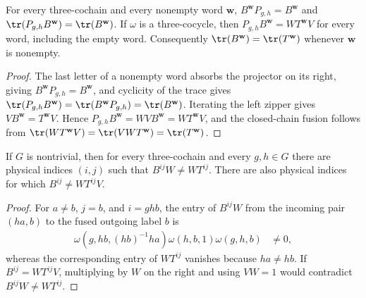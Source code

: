\begin{lemma}
    \label{thm:asymex_pbc_projector_closure}
    \leanok
    For every three-cochain and every nonempty word $\mathbf w$,
    $B^{\mathbf w}P_{g,h}=B^{\mathbf w}$ and
    $\tr(P_{g,h}B^{\mathbf w})=\tr(B^{\mathbf w})$.
    If $\omega$ is a three-cocycle, then
    $P_{g,h}B^{\mathbf w}=WT^{\mathbf w}V$ for every word, including the
    empty word. Consequently $\tr(B^{\mathbf w})=\tr(T^{\mathbf w})$
    whenever $\mathbf w$ is nonempty.
\end{lemma}

\begin{proof}
    \leanok
    The last letter of a nonempty word absorbs the projector on its right,
    giving $B^{\mathbf w}P_{g,h}=B^{\mathbf w}$, and cyclicity of the trace
    gives $\tr(P_{g,h}B^{\mathbf w})=\tr(B^{\mathbf w}P_{g,h})=\tr(B^{\mathbf w})$.
    Iterating the left zipper gives $VB^{\mathbf w}=T^{\mathbf w}V$.
    Hence $P_{g,h}B^{\mathbf w}=WVB^{\mathbf w}=WT^{\mathbf w}V$, and the
    closed-chain fusion follows from
    $\tr(WT^{\mathbf w}V)=\tr(VWT^{\mathbf w})=\tr(T^{\mathbf w})$.
\end{proof}

\begin{lemma}
    \label{thm:asymex_pbc_unprojected_failure}
    \leanok
    If $G$ is nontrivial, then for every three-cochain and every $g,h\in G$
    there are physical indices $(i,j)$ such that $B^{ij}W\ne WT^{ij}$.
    There are also physical indices for which $B^{ij}\ne WT^{ij}V$.
\end{lemma}

\begin{proof}
    \leanok
    For $a\ne b$, $j=b$, and $i=ghb$, the entry of $B^{ij}W$ from the
    incoming pair $(ha,b)$ to the fused outgoing label $b$ is
    \begin{align}
        \omega(g,hb,(hb)^{-1}ha)\omega(h,b,1)\omega(g,h,b) & \ne0,
        \label{eq:asymex_pbc_failure_entry}
    \end{align}
    whereas the corresponding entry of $WT^{ij}$ vanishes because $ha\ne hb$.
    If $B^{ij}=WT^{ij}V$, multiplying by $W$ on the right and using $VW=1$
    would contradict $B^{ij}W\ne WT^{ij}$.
\end{proof}

